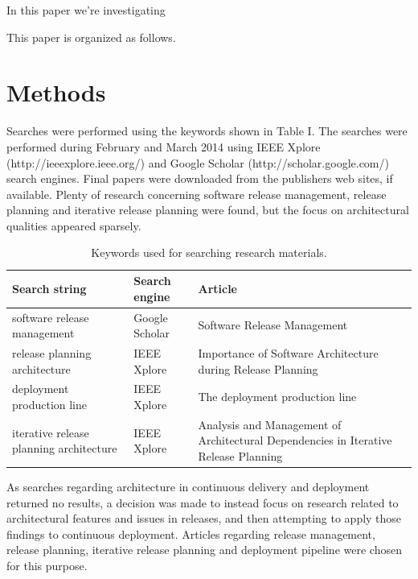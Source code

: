 \documentclass[conference]{IEEEtran}
\begin{document}

In this paper we're investigating %

This paper is organized as follows.

\section{Methods} %
Searches were performed using the keywords shown in Table I. The searches were performed during February and March 2014 using IEEE Xplore (http://ieeexplore.ieee.org/‎) and Google Scholar (http://scholar.google.com/) search engines. Final papers were downloaded from the publishers web sites, if available. Plenty of research concerning software release management, release planning and iterative release planning were found, but the focus on architectural qualities appeared sparsely.  
\begin{center}
\begin{table}[htb]
    \begin{tabular}{ | p{2cm} | p{2cm} | p{3.5cm} |}
    \hline
    Search string & Search engine & Article \\ \hline
    software release management & Google Scholar & Software Release Management \\ \hline
	release planning architecture & IEEE Xplore & Importance of Software Architecture during Release Planning \\ \hline
	deployment production line & IEEE Xplore & The deployment production line \\ \hline
	iterative release planning architecture & IEEE Xplore & Analysis and Management of Architectural Dependencies in Iterative Release Planning \\ \hline
    \end{tabular}
    \caption{Keywords used for searching research materials.}
    \end{table}
\end{center}
As searches regarding architecture in continuous delivery and deployment returned no results, a decision was made to instead focus on research related to architectural features and issues in releases, and then attempting to apply those findings to continuous deployment. Articles regarding release management, release planning, iterative release planning and deployment pipeline were chosen for this purpose.
\end{document}
